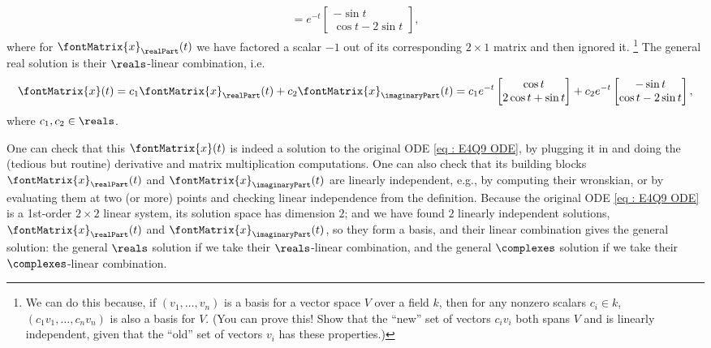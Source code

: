 {\begin{align*}
=
e^{-t}
\begin{bmatrix}%
-\sin t		\\
\cos t - 2 \sin t
\end{bmatrix}%
,
\end{align*}
where for $\fontMatrix{x}_{\realPart}(t)$ we have factored a scalar $-1$ out of its corresponding $2 \times 1$ matrix and then ignored it.%
\footnote{We can do this because, if $(v_{1},\ldots,v_{n})$ is a basis for a vector space $V$ over a field $k$, then for any nonzero scalars $c_{i} \in k$, $(c_{1} v_{1},\ldots,c_{n} v_{n})$ is also a basis for $V$. (You can prove this! Show that the ``new'' set of vectors $c_{i} v_{i}$ both spans $V$ and is linearly independent, given that the ``old'' set of vectors $v_{i}$ has these properties.)} %
The general real solution is their $\reals$-linear combination, i.e.
\begin{align*}
\fontMatrix{x}(t)
=
c_{1} \fontMatrix{x}_{\realPart}(t) + c_{2} \fontMatrix{x}_{\imaginaryPart}(t)
=
c_{1} e^{-t}
\begin{bmatrix}%
\cos t	\\
2 \cos t + \sin t
\end{bmatrix}%
+
c_{2} e^{-t}
\begin{bmatrix}%
-\sin t		\\
\cos t - 2 \sin t
\end{bmatrix}%
,
\end{align*}
where $c_{1},c_{2} \in \reals$.

One can check that this $\fontMatrix{x}(t)$ is indeed a solution to the original ODE \eqref{eq : E4Q9 ODE}, by plugging it in and doing the (tedious but routine) derivative and matrix multiplication computations. One can also check that its building blocks $\fontMatrix{x}_{\realPart}(t)$ and $\fontMatrix{x}_{\imaginaryPart}(t)$ are linearly independent, e.g., by computing their wronskian, or by evaluating them at two (or more) points and checking linear independence from the definition. Because the original ODE \eqref{eq : E4Q9 ODE} is a 1st-order $2 \times 2$ linear system, its solution space has dimension $2$; and we have found $2$ linearly independent solutions, $\fontMatrix{x}_{\realPart}(t)$ and $\fontMatrix{x}_{\imaginaryPart}(t)$, so they form a basis, and their linear combination gives the general solution: the general $\reals$ solution if we take their $\reals$-linear combination, and the general $\complexes$ solution if we take their $\complexes$-linear combination.}%



